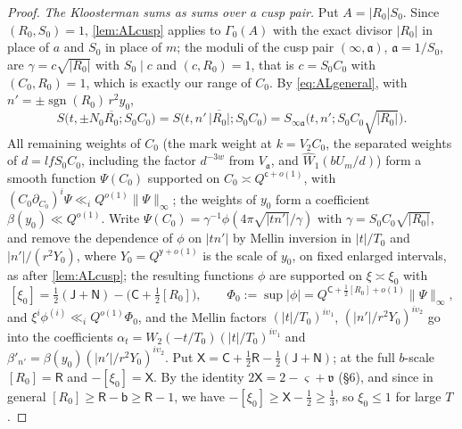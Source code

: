 \documentclass[11pt,colorlinks]{charlie}
\begin{document}
\begin{proof}
\emph{The Kloosterman sums as sums over a cusp pair.} Put $A=|R_0|S_0$. Since $(R_0,S_0)=1$, \cref{lem:ALcusp} applies to $\Gamma_0(A)$ with the exact divisor $|R_0|$ in place of $a$ and $S_0$ in place of $m$; the moduli of the cusp pair $(\infty,\mathfrak a)$, $\mathfrak a=1/S_0$, are $\gamma=c\sqrt{|R_0|}$ with $S_0\mid c$ and $(c,R_0)=1$, that is $c=S_0C_0$ with $(C_0,R_0)=1$, which is exactly our range of $C_0$. By \eqref{eq:ALgeneral}, with $n'=\pm\operatorname{sgn}(R_0)\,r^2y_0$,
\[
 S\big(t,\pm N_0\overline{R_0};S_0C_0\big)=S\big(t,n'\,\overline{|R_0|};S_0C_0\big)=S_{\infty\mathfrak a}\big(t,n';S_0C_0\sqrt{|R_0|}\big).
\]
All remaining weights of $C_0$ (the mark weight at $k=V_2C_0$, the separated weights of $d=lfS_0C_0$, including the factor $d^{-3w}$ from $V_{\mathfrak a}$, and $\widehat W_1(bU_m/d)$) form a smooth function $\Psi(C_0)$ supported on $C_0\asymp Q^{\mathsf c+o(1)}$, with $(C_0\partial_{C_0})^i\Psi\ll_iQ^{o(1)}\|\Psi\|_\infty$; the weights of $y_0$ form a coefficient $\beta(y_0)\ll Q^{o(1)}$. Write $\Psi(C_0)=\gamma^{-1}\phi(4\pi\sqrt{|tn'|}/\gamma)$ with $\gamma=S_0C_0\sqrt{|R_0|}$, and remove the dependence of $\phi$ on $|tn'|$ by Mellin inversion in $|t|/T_0$ and $|n'|/(r^2Y_0)$, where $Y_0=Q^{\mathsf y+o(1)}$ is the scale of $y_0$, on fixed enlarged intervals, as after \cref{lem:ALcusp}; the resulting functions $\phi$ are supported on $\xi\asymp\xi_0$ with
\[
 [\xi_0]=\tfrac12(\mathsf J+\mathsf N)-\big(\mathsf C+\tfrac12[R_0]\big),\qquad\Phi_0:=\sup|\phi|=Q^{\mathsf C+\frac12[R_0]+o(1)}\|\Psi\|_\infty,
\]
and $\xi^i\phi^{(i)}\ll_iQ^{o(1)}\Phi_0$, and the Mellin factors $(|t|/T_0)^{i\upsilon_1}$, $(|n'|/r^2Y_0)^{i\upsilon_2}$ go into the coefficients $\alpha_t=W_2(-t/T_0)(|t|/T_0)^{i\upsilon_1}$ and $\beta'_{n'}=\beta(y_0)(|n'|/r^2Y_0)^{i\upsilon_2}$. Put $\mathsf X=\mathsf C+\frac12\mathsf R-\frac12(\mathsf J+\mathsf N)$; at the full $b$-scale $[R_0]=\mathsf R$ and $-[\xi_0]=\mathsf X$. By the identity $2\mathsf X=2-\varsigma+\mathfrak v$ (\S6), and since in general $[R_0]\ge\mathsf R-\mathsf b\ge\mathsf R-1$, we have $-[\xi_0]\ge\mathsf X-\frac12\ge\frac13$, so $\xi_0\le1$ for large $T$.


\end{proof}
\end{document}
